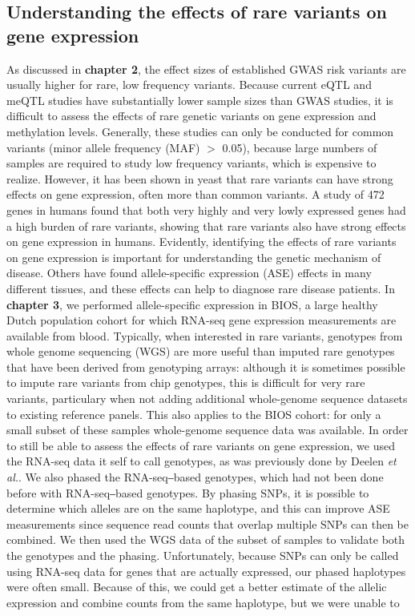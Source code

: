 \subsection{Understanding the effects of rare variants on gene expression}

As discussed in \textbf{chapter 2}, the effect sizes of established GWAS risk variants are usually higher for rare, low frequency variants. Because current eQTL and meQTL studies have substantially lower sample sizes than GWAS studies, it is difficult to assess the effects of rare genetic variants on gene expression and methylation levels. Generally, these studies can only be conducted for common variants (minor allele frequency (MAF) $>$ 0.05), because large numbers of samples are required to study low frequency variants, which is expensive to realize. However, it has been shown in yeast that rare variants can have strong effects on gene expression, often more than common variants\cite{bloomRareVariantsContribute2019}. A study of 472 genes in humans found that both very highly and very lowly expressed genes had a high burden of rare variants\cite{zhaoBurdenRareVariants2016}, showing that rare variants also have strong effects on gene expression in humans. Evidently, identifying the effects of rare variants on gene expression is important for understanding the genetic mechanism of disease. Others have found allele-specific expression (ASE) effects in many different tissues\cite{castelVastResourceAllelic2020}, and these effects can help to diagnose rare disease patients\cite{mohammadiGeneticRegulatoryVariation2019}. In \textbf{chapter 3}, we performed allele-specific expression in BIOS, a large healthy Dutch population cohort for which RNA-seq gene expression measurements are available from blood. Typically, when interested in rare variants, genotypes from whole genome sequencing (WGS) are more useful than imputed rare genotypes that have been derived from genotyping arrays: although it is sometimes possible to impute rare variants from chip genotypes, this is difficult for very rare variants, particulary when  not adding additional whole-genome sequence datasets to existing reference panels\cite{hoffmannStrategiesImputingAnalyzing2015}. This also applies to the BIOS cohort: for only a small subset of these samples whole-genome sequence data was available. In order to still be able to assess the effects of rare variants on gene expression, we used the RNA-seq data it self to call genotypes, as was previously done by Deelen \textit{et al.}\cite{deelenCallingGenotypesPublic2015}. We also phased the RNA-seq‒based genotypes, which had not been done before with RNA-seq‒based genotypes. By phasing SNPs, it is possible to determine which alleles are on the same haplotype, and this can improve ASE measurements since sequence read counts that overlap multiple SNPs can then be combined. We then used the WGS data of the subset of samples to validate both the genotypes and the phasing. Unfortunately, because SNPs can only be called using RNA-seq data for genes that are actually expressed, our phased haplotypes were often small. Because of this, we could get a better estimate of the allelic expression and combine counts from the same haplotype, but we were unable to 